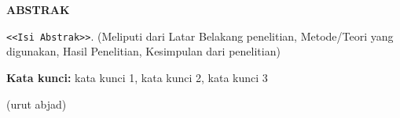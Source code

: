 \chapter*{\Judul}

\singlespacing
\begin{center}
    
    \vspace{-4em}
    
    \penulis
    
	\bigskip
    
    \textbf{ABSTRAK}
    
\end{center}


\vspace*{0.2cm}
{
	\setlength{\parindent}{0pt}

	\bigskip
	\bigskip

\verb|<<Isi Abstrak>>|. (Meliputi dari Latar Belakang penelitian, Metode/Teori yang digunakan, Hasil Penelitian, Kesimpulan dari penelitian)
	\bigskip
 
	\textbf{Kata kunci:} kata kunci 1, kata kunci 2, kata kunci 3
} (urut abjad)

\onehalfspacing